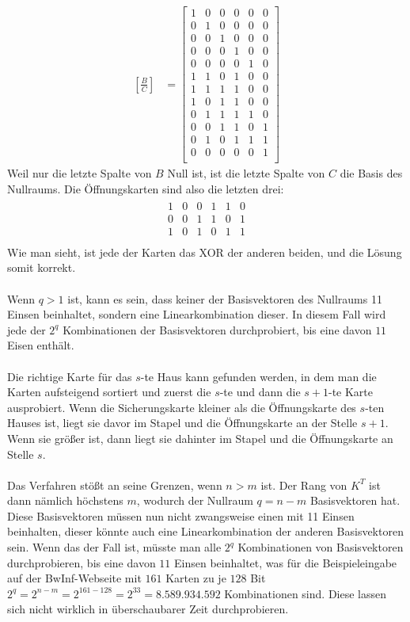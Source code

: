 \documentclass[a4paper,10pt,ngerman]{scrartcl}
\begin{document}
\begin{align*}
\left[\frac{B}{C}\right]&=\left[ \begin{array}{cccccc}
1 & 0 & 0 & 0 & 0 & 0 \\
0 & 1 & 0 & 0 & 0 & 0 \\
0 & 0 & 1 & 0 & 0 & 0 \\
0 & 0 & 0 & 1 & 0 & 0 \\
0 & 0 & 0 & 0 & 1 & 0 \\
1 & 1 & 0 & 1 & 0 & 0 \\
\hline
1 & 1 & 1 & 1 & 0 & 0 \\
1 & 0 & 1 & 1 & 0 & 0 \\
0 & 1 & 1 & 1 & 1 & 0 \\
0 & 0 & 1 & 1 & 0 & 1 \\
0 & 1 & 0 & 1 & 1 & 1 \\
0 & 0 & 0 & 0 & 0 & 1 \\
\end{array} \right]
\end{align*}
Weil nur die letzte Spalte von $B$ Null ist, ist die letzte Spalte von $C$ die Basis des Nullraums. Die Öffnungskarten sind also die letzten drei:
\begin{align*}
\begin{array}{cccccc}
1 & 0 & 0 & 1 & 1 & 0 \\
0 & 0 & 1 & 1 & 0 & 1 \\
1 & 0 & 1 & 0 & 1 & 1 \\
\end{array}
\end{align*}
Wie man sieht, ist jede der Karten das XOR der anderen beiden, und die Lösung somit korrekt. \\\\
Wenn $q>1$ ist, kann es sein, dass keiner der Basisvektoren des Nullraums 11 Einsen beinhaltet, sondern eine Linearkombination dieser. In diesem Fall wird jede der $2^q$ Kombinationen der Basisvektoren durchprobiert, bis eine davon $11$ Eisen enthält.\\\\
Die richtige Karte für das $s$-te Haus kann gefunden werden, in dem man die Karten aufsteigend sortiert und zuerst die $s$-te und dann die $s+1$-te Karte ausprobiert. Wenn die Sicherungskarte kleiner als die Öffnungskarte des $s$-ten Hauses ist, liegt sie davor im Stapel und die Öffnungskarte an der Stelle $s+1$. Wenn sie größer ist, dann liegt sie dahinter im Stapel und die Öffnungskarte an Stelle $s$.\\
\\
Das Verfahren stößt an seine Grenzen, wenn $n>m$ ist. Der Rang von $K^T$ ist dann nämlich höchstens $m$, wodurch der Nullraum $q=n-m$ Basisvektoren hat. Diese Basisvektoren müssen nun nicht zwangsweise einen mit 11 Einsen beinhalten, dieser könnte auch eine Linearkombination der anderen Basisvektoren sein. Wenn das der Fall ist, müsste man alle $2^q$ Kombinationen von Basisvektoren durchprobieren, bis eine davon $11$ Einsen beinhaltet, was für die Beispieleingabe auf der BwInf-Webseite mit $161$ Karten zu je $128$ Bit $2^q=2^{n-m}=2^{161-128}=2^{33}=8.589.934.592$ Kombinationen sind. Diese lassen sich nicht wirklich in überschaubarer Zeit durchprobieren.
\end{document}
